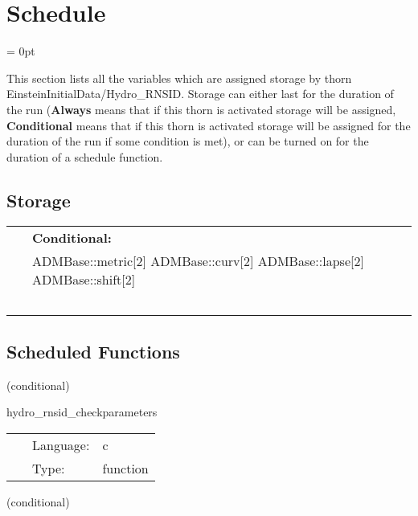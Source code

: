 
\section{Schedule} 


\parskip = 0pt


\noindent This section lists all the variables which are assigned storage by thorn EinsteinInitialData/Hydro\_RNSID.  Storage can either last for the duration of the run ({\bf Always} means that if this thorn is activated storage will be assigned, {\bf Conditional} means that if this thorn is activated storage will be assigned for the duration of the run if some condition is met), or can be turned on for the duration of a schedule function.


\subsection*{Storage}

\hspace{5mm}

 \begin{tabular*}{160mm}{ll} 
~& {\bf Conditional:} \\ 
~ &  ADMBase::metric[2] ADMBase::curv[2] ADMBase::lapse[2] ADMBase::shift[2]\\ 
~ & ~\\ 
\end{tabular*} 


\subsection*{Scheduled Functions}
\vspace{5mm}

   (conditional) 

\hspace{5mm} hydro\_rnsid\_checkparameters 

\hspace{5mm}{\it check parameters } 


\hspace{5mm}

 \begin{tabular*}{160mm}{cll} 
~ & Language:  & c \\ 
~ & Type:  & function \\ 
\end{tabular*} 


\vspace{5mm}

   (conditional) 

